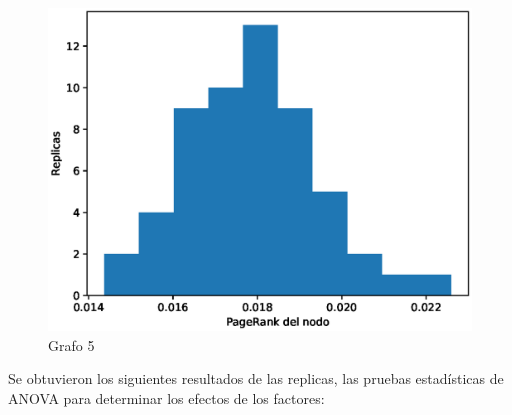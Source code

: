 \documentclass{article}
\begin{document}
\begin{figure}[H]
    \includegraphics[scale=0.6]{hist-excentricidad-5}
    \caption{Grafo 5}
    \label{fig:matriz}
\end{figure}
Se obtuvieron los siguientes resultados de las replicas, las pruebas estadísticas de ANOVA para determinar los efectos de los factores:
\end{document}
